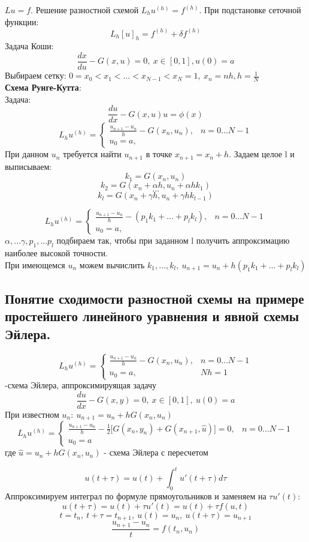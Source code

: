 \documentclass[a4paper]{article}
\begin{document}
$Lu=f$. Решение разностной схемой $L_hu^{(h)}=f^{(h)}$. При подстановке сеточной функции: $$ L_h[u]_h=f^{(h)}+\delta f^{(h)} $$
Задача Коши: $$ \frac{dx}{du}-G(x,u)=0,\ x\in[0,1],u(0)=a $$
Выбираем сетку: $0=x_0<x_1<\ldots<x_{N-1}<x_N=1, \ x_n=nh, h=\frac{1}{N}$ \\
\textbf{Схема Рунге-Кутта}:\\
Задача: $$ \frac{du}{dx}-G(x,u)u=\phi(x) $$
	$$L_hu^{(h)} = \begin{cases}
	\frac{u_{n+1}-u_n}{h} - G(x_n,u_n), & n=0\ldots N-1\\
	u_0=a, & \end{cases}$$
При данном $u_n$ требуется найти $u_{n+1}$ в точке $x_{n+1}=x_n+h$. Задаем целое l и выписываем:
$$ k_1=G(x_n,u_n)$$
$$ k_2=G(x_n + \alpha h, u_n+\alpha hk_1) $$
$$ \ldots $$
$$ k_l = G(x_n + \gamma h, u_n + \gamma hk_{l-1}) $$

$$L_hu^{(h)} = \begin{cases}
	\frac{u_{n+1}-u_n}{h} - (p_1 k_1 + \ldots + p_l k_l), & n=0\ldots N-1\\
	u_0=a, & \end{cases}$$
$\alpha, \ldots \gamma, p_1, \ldots p_l$ подбираем так, чтобы при заданном l получить аппроксимацию наиболее высокой точности. \\
При имеющемся $u_n$ можем вычислить $k_1, \ldots, k_l, \ u_{n+1}=u_n+h(p_1k_1 + \ldots + p_l k_l)$
\subsection{Понятие сходимости разностной схемы на примере простейшего линейного уравнения и явной схемы Эйлера.}
$$ L_hu^{(h)} = \begin{cases}
	\frac{u_{n+1}-u_n}{h} - G(x_n,u_n), & n=0\ldots N-1\\
	u_0=a, & Nh=1 \end{cases}$$
	-схема Эйлера, аппроксимируящая задачу $$ \frac{du}{dx} - G(x,y)=0, \ x \in [0,1], \ u(0)=a $$
	При известном $u_n: \ u_{n+1}=u_n+hG(x_n,u_n)$
$$ L_hu^{(h)} = \begin{cases}
	\frac{u_{n+1}-u_n}{h} - \frac{1}{2}\big[G(x_n,y_n)+G(x_{n+1}, \hat{u}) \big] = 0, & n=0\ldots N-1\\
	u_0=a \end{cases}$$
	где $\hat{u}=u_n+hG(x_n,u_n)$ - схема Эйлера с пересчетом

$$ u(t+\tau) = u(t) + \int_{0}^t u'(t+\tau) d\tau $$
Аппроксимируем интеграл по формуле прямоугольников и заменяем на $\tau u'(t)$:
$$ u(t+\tau)=u(t)+\tau u'(t) = u(t)+\tau f(u,t)$$
$$ t=t_n, \ t+\tau = t_{n+1}, \ u(t)=u_n, \ u(t+\tau) = u_{n+1}$$
$$ \frac{u_{n+1}-u_n}{t} = f(t_n,u_n)$$
\end{document}
